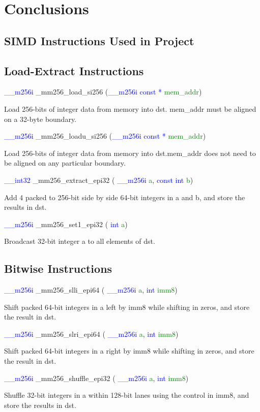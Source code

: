 \documentclass[11pt,oneside,a4paper]{article}
\makeatletter
\def\cleardoublepage{\clearpage\if@twoside \ifodd\c@page\else%
\hbox{}%
\thispagestyle{empty}%
\clearpage%
\if@twocolumn\hbox{}\clearpage\fi\fi\fi}
\makeatother
\begin{document}
\section{Conclusions}
\cleardoublepage
{}

\cleardoublepage




\begin{appendices}
\section{SIMD Instructions Used in Project}
\subsection{Load-Extract Instructions}
\textcolor{blue}{\_\_m256i} \_mm256\_load\_si256 (\textcolor{blue}{\_\_m256i const *} \textcolor{green}{mem\_addr})
\par Load 256-bits of integer data from memory into dst. mem\_addr must be aligned on a 32-byte boundary.
\par
\textcolor{blue}{\_\_m256i} \_mm256\_loadu\_si256 (\textcolor{blue}{\_\_m256i const *} \textcolor{green}{mem\_addr})
\par Load 256-bits of integer data from memory into dst.mem\_addr does not need to be aligned on any particular boundary.
\par
\textcolor{blue}{ \_\_int32} \_mm256\_extract\_epi32 ( \textcolor{blue}{ \_\_m256i} \textcolor{green}{a}, \textcolor{blue}{const int} \textcolor{green}{b})
\par Add 4 packed to 256-bit side by side 64-bit integers in a and b, and store the results in dst.
\par
\textcolor{blue}{ \_\_m256i} \_mm256\_set1\_epi32 ( \textcolor{blue}{ int} \textcolor{green}{a})
\par Broadcast 32-bit integer a to all elements of dst.
\par 
\subsection{Bitwise Instructions}
\textcolor{blue}{ \_\_m256i} \_mm256\_slli\_epi64 ( \textcolor{blue}{ \_\_m256i} \textcolor{green}{a}, \textcolor{blue}{int} \textcolor{green}{imm8})
\par Shift packed 64-bit integers in a left by imm8 while shifting in zeros, and store the result in dst.
\par
\textcolor{blue}{ \_\_m256i} \_mm256\_slri\_epi64 ( \textcolor{blue}{ \_\_m256i} \textcolor{green}{a}, \textcolor{blue}{int} \textcolor{green}{imm8})
\par Shift packed 64-bit integers in a right by imm8 while shifting in zeros, and store the result in dst.
\par
\textcolor{blue}{ \_\_m256i} \_mm256\_shuffle\_epi32 ( \textcolor{blue}{ \_\_m256i} \textcolor{green}{a}, \textcolor{blue}{int} \textcolor{green}{imm8})
\par Shuffle 32-bit integers in a within 128-bit lanes using the control in imm8, and store the results in dst.

\end{appendices}
\end{document}
